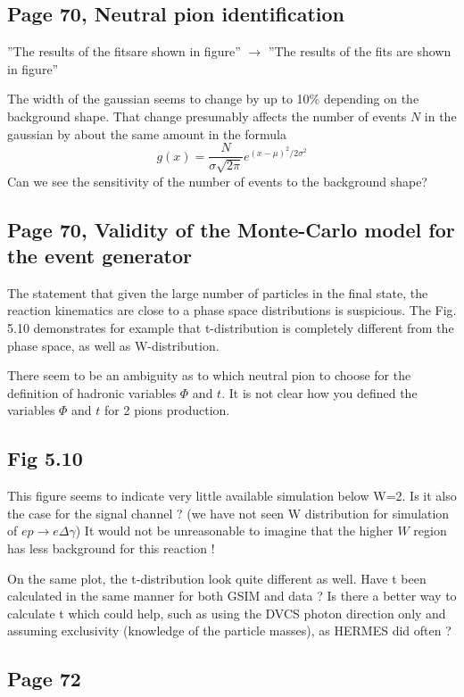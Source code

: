 \documentclass[11pt]{paper}
\begin{document}
\subsection*{Page 70, Neutral pion identification}

''The results of the fitsare shown in figure'' $\rightarrow$ ''The results of the fits are shown in figure''

The width of the gaussian seems to change by up to 10\% depending on the background shape.
That change presumably affects the number of events $N$ in the gaussian by about the same amount in the formula
$$g(x)=\frac{N}{\sigma\sqrt{2\pi}}e^{(x-\mu)^2/2\sigma^2}$$
Can we see the sensitivity of the number of events to the background shape?

\subsection*{Page 70, Validity of the Monte-Carlo model for the event generator}

The statement that given the large number of particles in the final state, the reaction kinematics are close to a phase space distributions is suspicious. 
The Fig. 5.10 demonstrates for example that t-distribution is completely different from the phase space, as well as W-distribution. 

There seem to be an ambiguity as to which neutral pion to choose for the definition of hadronic variables $\Phi$ and $t$.
It is not clear how you defined the variables $\Phi$ and $t$ for 2 pions production.

\subsection*{Fig 5.10}
This figure seems to indicate very little available simulation below W=2. 
Is it also the case for the signal channel ? (we have not seen W distribution for simulation of $ep\rightarrow e\Delta\gamma$)
It would not be unreasonable to imagine that the higher $W$ region has less background for this reaction !

On the same plot, the t-distribution look quite different as well.
Have t been calculated in the same manner for both GSIM and data ?
Is there a better way to calculate t which could help, such as using the DVCS photon direction only and assuming exclusivity (knowledge of the particle masses), as HERMES did often ?


\subsection*{Page 72}
\end{document}
